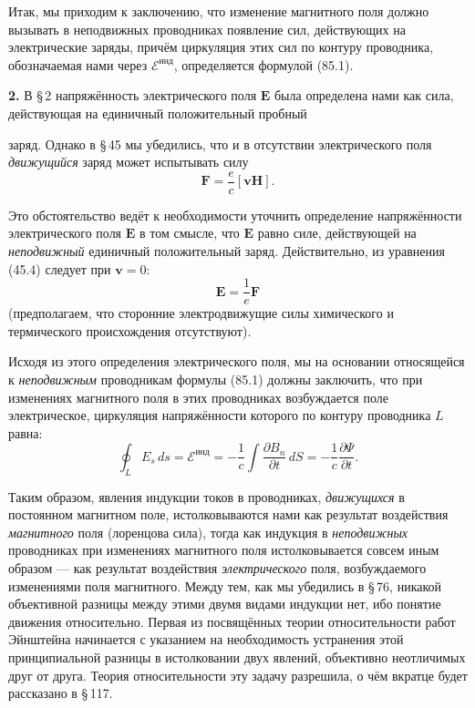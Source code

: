 \documentclass[a4paper,10pt]{article}
\begin{document}
Итак, мы приходим к заключению, что изменение магнитного поля должно
вызывать в неподвижных проводниках появление сил, действующих на
электрические заряды, причём циркуляция этих сил по контуру проводника,
обозначаемая нами через $\mathcal{E}^{\text{инд}}$, определяется
формулой (85.1).

\textbf{2.} В §\,2 напряжённость электрического поля $\mathbf{E}$ была
определена нами как сила, действующая на единичный положительный пробный


заряд. Однако в §\,45 мы убедились, что и в отсутствии электрического
поля \textit{движущийся} заряд может испытывать силу
$$
    \mathbf{F} = \frac{e}{c}[\mathbf{v}\mathbf{H}].
$$

Это обстоятельство ведёт к необходимости уточнить определение
напряжённости электрического поля $\mathbf{E}$ в том смысле, что
$\mathbf{E}$ равно силе, действующей на \textit{неподвижный} единичный
положительный заряд. Действительно, из уравнения (45.4) следует при
$\mathbf{v} = 0$:
$$
    \mathbf{E} = \frac{1}{e}\mathbf{F}
$$
(предполагаем, что сторонние электродвижущие силы химического и
термического происхождения отсутствуют).

Исходя из этого определения электрического поля, мы на основании
относящейся к \textit{неподвижным} проводникам формулы (85.1) должны
заключить, что при изменениях магнитного поля в этих проводниках
возбуждается поле электрическое, циркуляция напряжённости которого по
контуру проводника $L$ равна:
\begin{equation}
    \oint_L E_s\,ds = \mathcal{E}^{\text{инд}}
    = -\frac{1}{c}\int\frac{\partial B_n}{\partial t}\,dS
    = -\frac{1}{c}\frac{\partial\Psi}{\partial t}.
    \tag{85.2}
\end{equation}

Таким образом, явления индукции токов в проводниках, \textit{движущихся}
в постоянном магнитном поле, истолковываются нами как результат
воздействия \textit{магнитного} поля (лоренцова сила), тогда как
индукция в \textit{неподвижных} проводниках при изменениях магнитного
поля истолковывается совсем иным образом — как результат воздействия
\textit{электрического} поля, возбуждаемого изменениями поля магнитного.
Между тем, как мы убедились в §\,76, никакой объективной разницы между
этими двумя видами индукции нет, ибо понятие движения относительно.
Первая из посвящённых теории относительности работ Эйнштейна начинается
с указанием на необходимость устранения этой принципиальной разницы
в истолковании двух явлений, объективно неотличимых друг от друга.
Теория относительности эту задачу разрешила, о чём вкратце будет
рассказано в §\,117.
\end{document}

